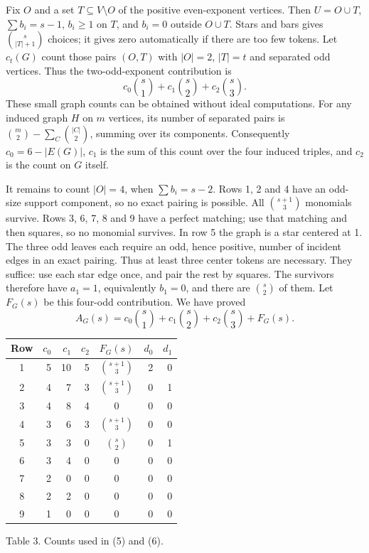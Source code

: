 \documentclass[11pt]{article}
\newcommand{\bin}[2]{\binom{#1}{#2}}
\begin{document}
Fix \(O\) and a set \(T\subseteq V\setminus O\) of the positive
even-exponent vertices. Then \(U=O\cup T\),
\(\sum b_i=s-1\), \(b_i\geq1\) on \(T\), and
\(b_i=0\) outside \(O\cup T\). Stars and bars gives
\(\bin{s}{|T|+1}\) choices; it gives zero automatically if there
are too few tokens. Let \(c_t(G)\) count those pairs \((O,T)\)
with \(|O|=2\), \(|T|=t\) and separated odd vertices. Thus
the two-odd-exponent contribution is
\[
            c_0\bin{s}{1}+c_1\bin{s}{2}+c_2\bin{s}{3}.      \tag{4}
\]
These small graph counts can be obtained without ideal computations.
For any induced graph \(H\) on \(m\) vertices, its number of
separated pairs is \(\bin m2-\sum_C\bin{|C|}{2}\), summing over
its components. Consequently \(c_0=6-|E(G)|\), \(c_1\) is the
sum of this count over the four induced triples, and \(c_2\) is
the count on \(G\) itself.

It remains to count \(|O|=4\), when \(\sum b_i=s-2\).
Rows 1, 2 and 4 have an odd-size support component, so no exact
pairing is possible. All \(\bin{s+1}{3}\) monomials survive.
Rows 3, 6, 7, 8 and 9 have a perfect matching; use that matching
and then squares, so no monomial survives.
In row 5 the graph is a star centered at 1. The three odd leaves
each require an odd, hence positive, number of incident edges in
an exact pairing. Thus at least three center tokens are necessary.
They suffice: use each star edge once, and pair the rest by squares.
The survivors therefore have \(a_1=1\), equivalently \(b_1=0\),
and there are \(\bin{s}{2}\) of them.
Let \(F_G(s)\) be this four-odd contribution. We have proved
\[
 A_G(s)=c_0\bin{s}{1}+c_1\bin{s}{2}+c_2\bin{s}{3}+F_G(s).  \tag{5}
\]

\begin{center}
\renewcommand{\arraystretch}{1.18}
\begin{tabular}{c rrr c rr}
\toprule
Row&\(c_0\)&\(c_1\)&\(c_2\)&\(F_G(s)\)&\(d_0\)&\(d_1\)\\\midrule
1&5&10&5&\(\bin{s+1}{3}\)&2&0\\
2&4&7&3&\(\bin{s+1}{3}\)&0&1\\
3&4&8&4&0&0&0\\
4&3&6&3&\(\bin{s+1}{3}\)&0&0\\
5&3&3&0&\(\bin{s}{2}\)&0&1\\
6&3&4&0&0&0&0\\
7&2&0&0&0&0&0\\
8&2&2&0&0&0&0\\
9&1&0&0&0&0&0\\\bottomrule
\end{tabular}
\par\smallskip Table 3. Counts used in (5) and (6).
\end{center}
\end{document}
